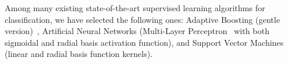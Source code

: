 \documentclass[10pt,twocolumn,letterpaper]{article}
\begin{document}
Among many existing state-of-the-art supervised learning algorithms for classification, we have selected the following ones: Adaptive Boosting (gentle version)~\cite{freund1999short}, Artificial Neural Networks (Multi-Layer Perceptron~\cite{rosenblatt1961principles} with both sigmoidal and radial basis activation function), and Support Vector Machines~\cite{cortes1995support} (linear and radial basis function kernels).

%
%
\end{document}
